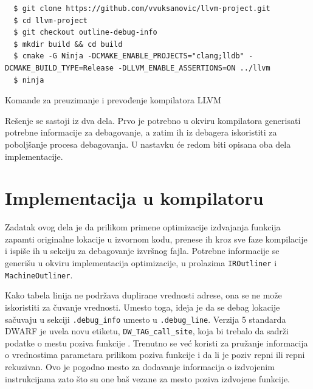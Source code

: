 \documentclass[12pt,oneside]{memoir}
\begin{document}
\begin{listing}[!ht]
\begin{verbatim}
  $ git clone https://github.com/vvuksanovic/llvm-project.git
  $ cd llvm-project
  $ git checkout outline-debug-info
  $ mkdir build && cd build
  $ cmake -G Ninja -DCMAKE_ENABLE_PROJECTS="clang;lldb" -DCMAKE_BUILD_TYPE=Release -DLLVM_ENABLE_ASSERTIONS=ON ../llvm
  $ ninja
\end{verbatim}
\caption{Komande za preuzimanje i prevođenje kompilatora LLVM}
\label{lst:llvm_compile_commands}
\end{listing}

Rešenje se sastoji iz dva dela.
Prvo je potrebno u okviru kompilatora generisati potrebne informacije za debagovanje, a zatim ih iz debagera iskoristiti za poboljšanje procesa debagovanja.
U nastavku će redom biti opisana oba dela implementacije.

\section{Implementacija u kompilatoru}
\label{sec:compiler_impl}


Zadatak ovog dela je da prilikom primene optimizacije izdvajanja funkcija zapamti originalne lokacije u izvornom kodu, prenese ih kroz sve faze kompilacije i ispiše ih u sekciju za debagovanje izvršnog fajla.
Potrebne informacije se generišu u okviru implementacija optimizacije, u prolazima \verb|IROutliner| i \verb|MachineOutliner|.

Kako tabela linija ne podržava duplirane vrednosti adrese, ona se ne može iskoristiti za čuvanje vrednosti.
Umesto toga, ideja je da se debag lokacije sačuvaju u sekciji \verb|.debug_info| umesto u \verb|.debug_line|.
Verzija 5 standarda DWARF je uvela novu etiketu, \verb|DW_TAG_call_site|, koja bi trebalo da sadrži podatke o mestu poziva funkcije \cite{jelinek2010callsite}.
Trenutno se već koristi za pružanje informacija o vrednostima parametara prilikom poziva funkcije \cite{jelinek2010entryvalue} i da li je poziv repni ili repni rekuzivan. %
Ovo je pogodno mesto za dodavanje informacija o izdvojenim instrukcijama zato što su one baš vezane za mesto poziva izdvojene funkcije.
\end{document}
